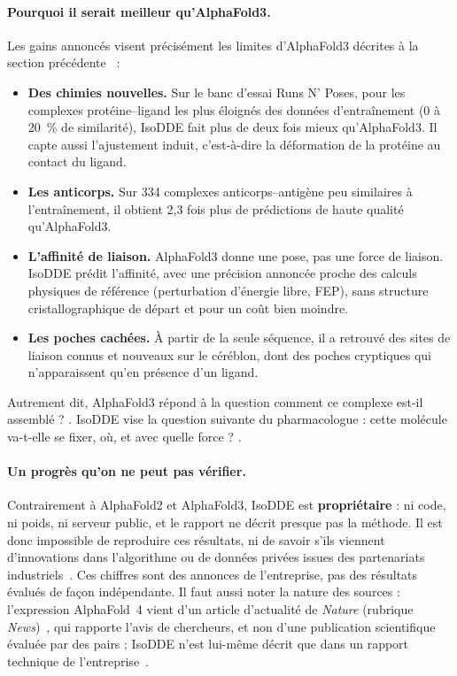 \paragraph{Pourquoi il serait meilleur qu'AlphaFold3.} Les gains annoncés visent précisément les limites d'AlphaFold3 décrites à la section précédente~\cite{isodde2026,callaway2026} :
\begin{itemize}
  \item \textbf{Des chimies nouvelles.} Sur le banc d'essai Runs N' Poses, pour les complexes protéine--ligand les plus éloignés des données d'entraînement (0 à 20~\% de similarité), IsoDDE fait plus de deux fois mieux qu'AlphaFold3. Il capte aussi l'ajustement induit, c'est-à-dire la déformation de la protéine au contact du ligand.
  \item \textbf{Les anticorps.} Sur 334 complexes anticorps--antigène peu similaires à l'entraînement, il obtient 2,3 fois plus de prédictions de haute qualité qu'AlphaFold3.
  \item \textbf{L'affinité de liaison.} AlphaFold3 donne une pose, pas une force de liaison. IsoDDE prédit l'affinité, avec une précision annoncée proche des calculs physiques de référence (perturbation d'énergie libre, FEP), sans structure cristallographique de départ et pour un coût bien moindre.
  \item \textbf{Les poches cachées.} À partir de la seule séquence, il a retrouvé des sites de liaison connus et nouveaux sur le céréblon, dont des poches \og cryptiques \fg{} qui n'apparaissent qu'en présence d'un ligand.
\end{itemize}
Autrement dit, AlphaFold3 répond à la question \og comment ce complexe est-il assemblé ? \fg{}. IsoDDE vise la question suivante du pharmacologue : \og cette molécule va-t-elle se fixer, où, et avec quelle force ? \fg{}.

\paragraph{Un progrès qu'on ne peut pas vérifier.} Contrairement à AlphaFold2 et AlphaFold3, IsoDDE est \textbf{propriétaire} : ni code, ni poids, ni serveur public, et le rapport ne décrit presque pas la méthode. Il est donc impossible de reproduire ces résultats, ni de savoir s'ils viennent d'innovations dans l'algorithme ou de données privées issues des partenariats industriels~\cite{callaway2026}. Ces chiffres sont des annonces de l'entreprise, pas des résultats évalués de façon indépendante. Il faut aussi noter la nature des sources : l'expression \og AlphaFold~4 \fg{} vient d'un article d'actualité de \emph{Nature} (rubrique \emph{News})~\cite{callaway2026}, qui rapporte l'avis de chercheurs, et non d'une publication scientifique évaluée par des pairs ; IsoDDE n'est lui-même décrit que dans un rapport technique de l'entreprise~\cite{isodde2026}.

